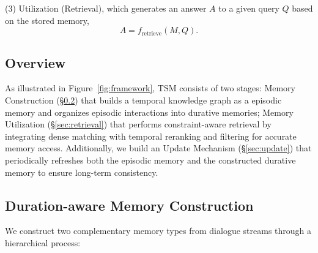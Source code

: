 \documentclass[11pt]{article}
\newcommand{\ours}[1]{TSM}
\begin{document}
(3) Utilization (Retrieval), which generates an answer $A$ to a given query $Q$ based on the stored memory,
\[
A = f_{\text{retrieve}}(M,Q).
\]


\subsection{Overview}


As illustrated in Figure~\ref{fig:framework}, \ours{} consists of two stages: Memory Construction (\S\ref{sec:construction}) that builds a temporal knowledge graph as a episodic memory and organizes episodic interactions into durative memories; Memory Utilization (\S\ref{sec:retrieval}) that performs constraint-aware retrieval by integrating dense matching with temporal reranking and filtering for accurate memory access. Additionally, we build an Update Mechanism (\S\ref{sec:update}) that periodically refreshes both the episodic memory and the constructed durative memory to ensure long-term consistency.  





\subsection{Duration-aware Memory Construction}
\label{sec:construction}
We construct two complementary memory types from dialogue streams through a hierarchical process:
\end{document}
